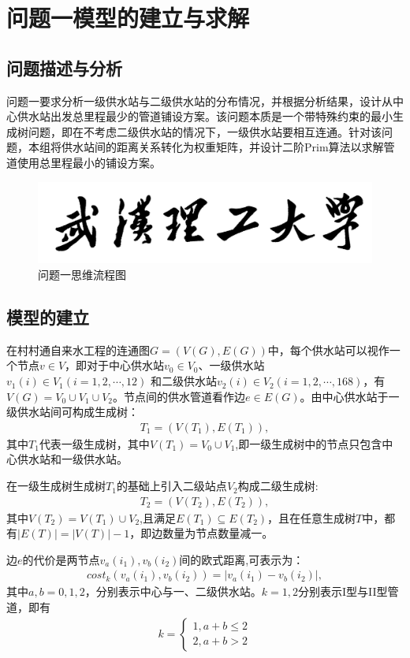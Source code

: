 \documentclass{whutmod}
\begin{document}
	\section{问题一模型的建立与求解}
		\subsection{问题描述与分析}
			问题一要求分析一级供水站与二级供水站的分布情况，并根据分析结果，设计从中心供水站出发总里程最少的管道铺设方案。该问题本质是一个带特殊约束的最小生成树问题，即在不考虑二级供水站的情况下，一级供水站要相互连通。针对该问题，本组将供水站间的距离关系转化为权重矩阵，并设计二阶Prim算法以求解管道使用总里程最小的铺设方案。
			
		
			\begin{figure}[H]
				\centering
				\includegraphics[width=\textwidth]{figures/whut.jpg}
				\caption{问题一思维流程图}\label{lct}
			\end{figure}
			
		\subsection{模型的建立}
		在村村通自来水工程的连通图$G=(V(G),E(G))$中，每个供水站可以视作一个节点$v \in V$，即对于中心供水站$v_0 \in V_0$、一级供水站$v_1(i) \in V_1 (i=1,2,\cdots,12)$ 和二级供水站$v_2(i) \in V_2 (i=1,2,\cdots,168)$，有$V(G)=V_0\cup  V_1\cup V_2$。节点间的供水管道看作边$e \in E(G)$。由中心供水站于一级供水站间可构成生成树：
		\begin{gather*}
		T_{1}=(V(T_{1}),E(T_{1})),
		\end{gather*}
		其中$T_{1}$代表一级生成树，其中$V(T_{1})=V_0\cup V_1$,即一级生成树中的节点只包含中心供水站和一级供水站。
		
		在一级生成树生成树$T_1$的基础上引入二级站点$V_2$构成二级生成树:
		\begin{gather*}	
		T_{2}=(V(T_{2}),E(T_{2})),
		\end{gather*}
		其中$V(T_{2})=V(T_{1})\cup V_2$,且满足$E(T_{1})\subseteq  E(T_{2})$，且在任意生成树$T$中，都有$|E(T)|=|V(T)|-1$，即边数量为节点数量减一。
		
		边$e$的代价是两节点$v_a(i_1), v_b(i_2)$间的欧式距离,可表示为：
		\begin{gather}
		cost_{k}(v_a(i_1),v_b(i_2))=\left | v_a(i_1)-v_b(i_2) \right |,
		\end{gather}
		其中$a,b=0,1,2$，分别表示中心与一、二级供水站。$k=1,2$分别表示I型与II型管道，即有
			\begin{gather}
			k=\left\{\begin{matrix}1,a+b\leqslant 2
			\\ 2,a+b>2
			\end{matrix}\right.
			\end{gather}
		
\end{document}
